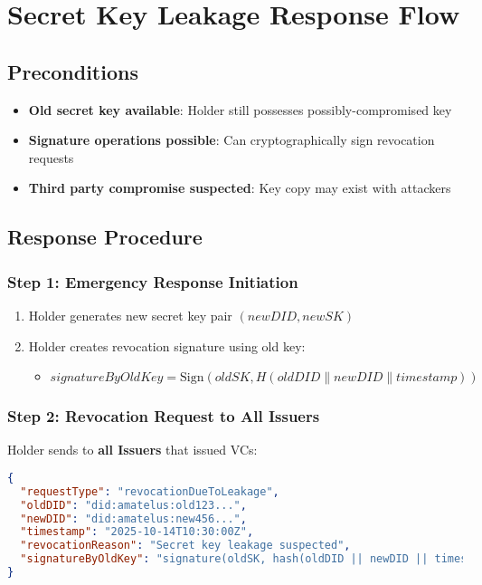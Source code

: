 \section{Secret Key Leakage Response Flow}

\subsection{Preconditions}

\begin{itemize}
  \item \textbf{Old secret key available}: Holder still possesses possibly-compromised key
  \item \textbf{Signature operations possible}: Can cryptographically sign revocation requests
  \item \textbf{Third party compromise suspected}: Key copy may exist with attackers
\end{itemize}

\subsection{Response Procedure}

\subsubsection{Step 1: Emergency Response Initiation}

\begin{enumerate}
  \item Holder generates new secret key pair $(newDID, newSK)$
  \item Holder creates revocation signature using old key:
    \begin{itemize}
      \item $signatureByOldKey = \text{Sign}(oldSK, H(oldDID \parallel newDID \parallel timestamp))$
    \end{itemize}
\end{enumerate}

\subsubsection{Step 2: Revocation Request to All Issuers}

Holder sends to \textbf{all Issuers} that issued VCs:

\begin{lstlisting}[language=json]
{
  "requestType": "revocationDueToLeakage",
  "oldDID": "did:amatelus:old123...",
  "newDID": "did:amatelus:new456...",
  "timestamp": "2025-10-14T10:30:00Z",
  "revocationReason": "Secret key leakage suspected",
  "signatureByOldKey": "signature(oldSK, hash(oldDID || newDID || timestamp))"
}
\end{lstlisting}

